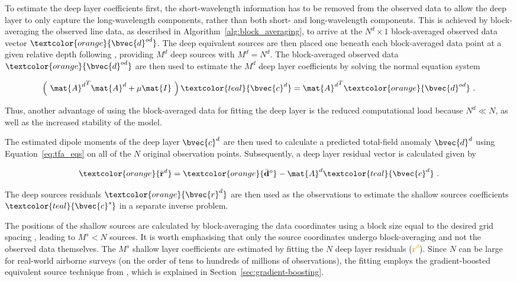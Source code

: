 To estimate the deep layer coefficients first, the short-wavelength information has to be removed from the observed data to allow the deep layer to only capture the long-wavelength components, rather than both short- and long-wavelength components. This is achieved by block-averaging the observed line data, as described in Algorithm~\ref{alg:block_averaging}, to arrive at the $N^d \times 1$ block-averaged observed data vector $\textcolor{orange}{\bvec{d}^{od}}$. The deep equivalent sources are then placed one beneath each block-averaged data point at a given relative depth following \citet{Soler2021}, providing $M^d$ deep sources with $M^d = N^d$. The block-averaged observed data $\textcolor{orange}{\bvec{d}^{od}}$ are then used to estimate the $M^d$ deep layer coefficients by solving the normal equation system

\begin{equation}
    \left(\ {\mat{A}^d}^T \mat{A}^d + \mu \mat{I}\ \right) 
    \textcolor{teal}{\bvec{c}^d} =
    {\mat{A}^d}^T\textcolor{orange}{\bvec{d}^{od}}
    \ .
\end{equation}

\noindent
Thus, another advantage of using the block-averaged data for fitting the deep layer is the reduced computational load because $N^d \ll N$, as well as the increased stability of the model. 

The estimated dipole moments of the deep layer \textcolor{teal}{$\bvec{c}^d$} are then used to calculate a predicted total-field anomaly \textcolor{orange}{$\bvec{d}^d$} using Equation~\ref{eq:tfa_eqs} on all of the $N$ original observation points. Subsequently, a deep layer residual vector is calculated given by

\begin{equation}
    \textcolor{orange}{\bar{\mathbf{r}}^d} = 
    \textcolor{orange}{\bar{\mathbf{d}}^o} - \mat{A}^d \textcolor{teal}{\bvec{c}^d}
    \ .
    \label{eq:deep_residual}
\end{equation}

\noindent
The deep sources residuals $\textcolor{orange}{\bvec{r}^d}$ are then used as the observations to estimate the shallow sources coefficients $\textcolor{teal}{\bvec{c}^s}$ in a separate inverse problem. 

The positions of the shallow sources are calculated by block-averaging the data coordinates using a block size equal to the desired grid spacing \citep{Soler2021}, leading to $M^s < N$ sources. It is worth emphasising that only the source coordinates undergo block-averaging and not the observed data themselves. The $M^s$ shallow layer coefficients are estimated by fitting the $N$ deep layer residuals (\textcolor{orange}{$\bar{\mathbf{r}}^d$}). Since $N$ can be large for real-world airborne surveys (on the order of tens to hundreds of millions of observations), the fitting employs the gradient-boosted equivalent source technique from \citet{Soler2021}, which is explained in Section~\ref{sec:gradient-boosting}. 

